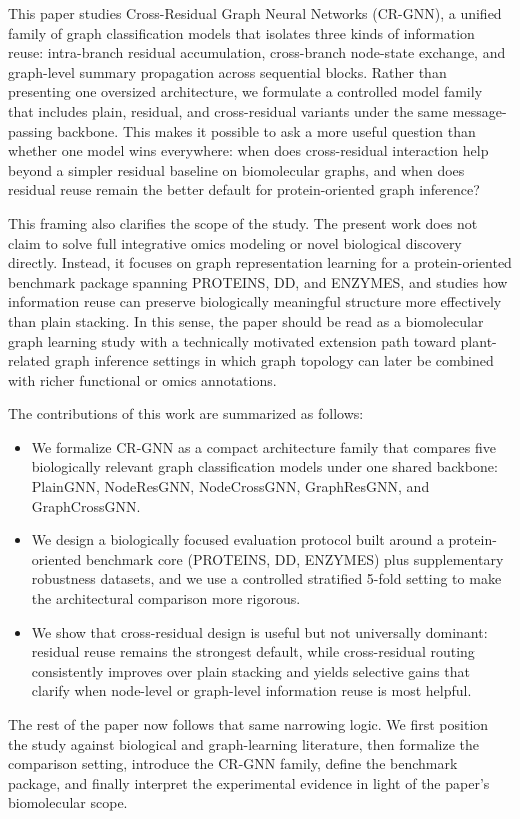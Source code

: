 This paper studies Cross-Residual Graph Neural Networks (CR-GNN), a unified family of graph classification models that isolates three kinds of information reuse: intra-branch residual accumulation, cross-branch node-state exchange, and graph-level summary propagation across sequential blocks. Rather than presenting one oversized architecture, we formulate a controlled model family that includes plain, residual, and cross-residual variants under the same message-passing backbone. This makes it possible to ask a more useful question than whether one model wins everywhere: when does cross-residual interaction help beyond a simpler residual baseline on biomolecular graphs, and when does residual reuse remain the better default for protein-oriented graph inference?

This framing also clarifies the scope of the study. The present work does not claim to solve full integrative omics modeling or novel biological discovery directly. Instead, it focuses on graph representation learning for a protein-oriented benchmark package spanning PROTEINS, DD, and ENZYMES, and studies how information reuse can preserve biologically meaningful structure more effectively than plain stacking. In this sense, the paper should be read as a biomolecular graph learning study with a technically motivated extension path toward plant-related graph inference settings in which graph topology can later be combined with richer functional or omics annotations.

The contributions of this work are summarized as follows:

\begin{itemize}
    \item We formalize CR-GNN as a compact architecture family that compares five biologically relevant graph classification models under one shared backbone: PlainGNN, NodeResGNN, NodeCrossGNN, GraphResGNN, and GraphCrossGNN.
    \item We design a biologically focused evaluation protocol built around a protein-oriented benchmark core (PROTEINS, DD, ENZYMES) plus supplementary robustness datasets, and we use a controlled stratified 5-fold setting to make the architectural comparison more rigorous.
    \item We show that cross-residual design is useful but not universally dominant: residual reuse remains the strongest default, while cross-residual routing consistently improves over plain stacking and yields selective gains that clarify when node-level or graph-level information reuse is most helpful.
\end{itemize}

The rest of the paper now follows that same narrowing logic. We first position the study against biological and graph-learning literature, then formalize the comparison setting, introduce the CR-GNN family, define the benchmark package, and finally interpret the experimental evidence in light of the paper's biomolecular scope.

